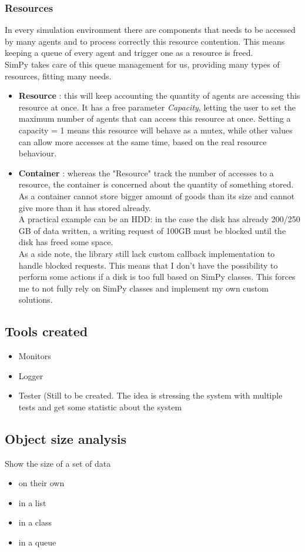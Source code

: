 \subsubsection*{Resources}
In every simulation environment there are components that needs to be accessed
by many agents and to process correctly this resource contention. This means
keeping a queue of every agent and trigger one as a resource is freed. \\
SimPy takes care of this queue management for us, providing many types of
resources, fitting many needs.
\begin{itemize}
    \item \textbf{Resource} \cite{simpy-resource}: this will keep accounting the quantity
        of agents are accessing this resource at once. It has a free parameter
        \textit{Capacity}, letting the user to set the maximum number of agents
        that can access this resource at once. Setting a capacity = 1 means this
        resource will behave as a mutex, while other values can allow more
        accesses at the same time, based on the real resource behaviour.
    \item \textbf{Container} \cite{simpy-container}: whereas the "Resource" track the
        number of accesses to a resource, the container is concerned about the
        quantity of something stored. As a container cannot store bigger amount
        of goods than its size and cannot give more than it has stored already.
        \\
        A practical example can be an HDD: in the case the disk has already
        200/250 GB of data written, a writing request of 100GB must be blocked
        until the disk has freed some space. \\
        As a side note, the library still lack custom callback implementation to
        handle blocked requests. This means that I don't have the possibility to
        perform some actions if a disk is too full based on SimPy classes. This
        forces me to not fully rely on SimPy classes and implement my own
        custom solutions.
\end{itemize}

\subsection{Tools created}
\begin{itemize}
    \item Monitors
    \item Logger
    \item Tester (Still to be created. The idea is stressing the system with
        multiple tests and get some statistic about the system
\end{itemize}

\subsection{Object size analysis}
Show the size of a set of data
\begin{itemize}
    \item on their own
    \item in a list
    \item in a class
    \item in a queue
\end{itemize}
